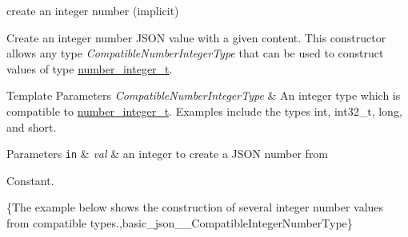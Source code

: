 create an integer number (implicit) 

Create an integer number J\-S\-O\-N value with a given content. This constructor allows any type {\itshape Compatible\-Number\-Integer\-Type} that can be used to construct values of type \hyperlink{classnlohmann_1_1basic__json_ac4b10b2364f26ce47bdb9a413ff04a59}{number\-\_\-integer\-\_\-t}.


\begin{DoxyTemplParams}{Template Parameters}
{\em Compatible\-Number\-Integer\-Type} & An integer type which is compatible to \hyperlink{classnlohmann_1_1basic__json_ac4b10b2364f26ce47bdb9a413ff04a59}{number\-\_\-integer\-\_\-t}. Examples include the types {\ttfamily int}, {\ttfamily int32\-\_\-t}, {\ttfamily long}, and {\ttfamily short}.\\
\hline
\end{DoxyTemplParams}

\begin{DoxyParams}[1]{Parameters}
\mbox{\tt in}  & {\em val} & an integer to create a J\-S\-O\-N number from\\
\hline
\end{DoxyParams}
Constant.

\{The example below shows the construction of several integer number values from compatible types.,basic\-\_\-json\-\_\-\-\_\-\-Compatible\-Integer\-Number\-Type\}


